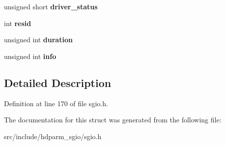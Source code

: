 \begin{DoxyCompactItemize}
\item 
\hypertarget{structscsi__sg__io__hdr_a1474c689250d0cfad346c0df5cd043c1}{}unsigned short {\bfseries driver\+\_\+status}\label{structscsi__sg__io__hdr_a1474c689250d0cfad346c0df5cd043c1}

\item 
\hypertarget{structscsi__sg__io__hdr_aeb3f2160b405983b186bd6d4433ed806}{}int {\bfseries resid}\label{structscsi__sg__io__hdr_aeb3f2160b405983b186bd6d4433ed806}

\item 
\hypertarget{structscsi__sg__io__hdr_a944d0e9305f6ca62be25500ec142abf8}{}unsigned int {\bfseries duration}\label{structscsi__sg__io__hdr_a944d0e9305f6ca62be25500ec142abf8}

\item 
\hypertarget{structscsi__sg__io__hdr_a9a1f57cab66e5cbd8d4ce0aa3242aa81}{}unsigned int {\bfseries info}\label{structscsi__sg__io__hdr_a9a1f57cab66e5cbd8d4ce0aa3242aa81}

\end{DoxyCompactItemize}


\subsection{Detailed Description}


Definition at line 170 of file sgio.\+h.



The documentation for this struct was generated from the following file\+:\begin{DoxyCompactItemize}
\item 
src/include/hdparm\+\_\+sgio/sgio.\+h\end{DoxyCompactItemize}
